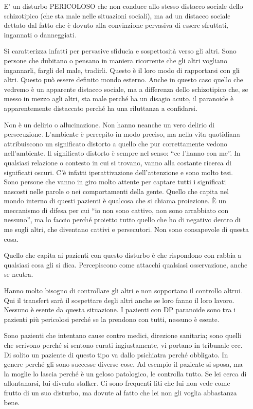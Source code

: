 \documentclass[]{article}
\begin{document}
E' un disturbo PERICOLOSO che non conduce allo stesso distacco sociale
dello schizotipico (che sta male nelle situazioni sociali), ma ad un
distacco sociale dettato dal fatto che è dovuto alla convinzione
pervasiva di essere sfruttati, ingannati o danneggiati.

Si caratterizza infatti per pervasive sfiducia e sospettosità verso gli
altri. Sono persone che dubitano o pensano in maniera ricorrente che gli
altri vogliano ingannarli, fargli del male, tradirli. Questo è il loro
modo di rapportarsi con gli altri. Questo può essere definito mondo
esterno. Anche in questo caso quello che vedremo è un apparente distacco
sociale, ma a differenza dello schizotipico che, se messo in mezzo agli
altri, sta male perché ha un disagio acuto, il paranoide è
apparentemente distaccato perché ha una riluttanza a confidarsi.

Non è un delirio o allucinazione. Non hanno neanche un vero delirio di
persecuzione. L'ambiente è percepito in modo preciso, ma nella vita
quotidiana attribuiscono un significato distorto a quello che pur
correttamente vedono nell'ambiente. Il significato distorto è sempre nel
senso: ``ce l'hanno con me''. In qualsiasi relazione o contesto in cui
si trovano, vanno alla costante ricerca di significati oscuri. C'è
infatti iperattivazione dell'attenzione e sono molto tesi. Sono persone
che vanno in giro molto attente per captare tutti i significati nascosti
nelle parole o nei comportamenti della gente. Quello che capita nel
mondo interno di questi pazienti è qualcosa che si chiama proiezione. È
un meccanismo di difesa per cui ``io non sono cattivo, non sono
arrabbiato con nessuno'', ma lo faccio perché proietto tutto quello che
ho di negativo dentro di me sugli altri, che diventano cattivi e
persecutori. Non sono consapevole di questa cosa.

Quello che capita ai pazienti con questo disturbo è che rispondono con
rabbia a qualsiasi cosa gli si dica. Percepiscono come attacchi
qualsiasi osservazione, anche se neutra.

Hanno molto bisogno di controllare gli altri e non sopportano il
controllo altrui. Qui il transfert sarà il sospettare degli altri anche
se loro fanno il loro lavoro. Nessuno è esente da questa situazione. I
pazienti con DP paranoide sono tra i pazienti più pericolosi perché se
la prendono con tutti, nessuno è esente.

Sono pazienti che intentano cause contro medici, direzione sanitaria;
sono quelli che scrivono perché si sentono curati ingiustamente, vi
portano in tribunale ecc. Di solito un paziente di questo tipo va dallo
psichiatra perché obbligato. In genere perché gli sono successe diverse
cose. Ad esempio il paziente si sposa, ma la moglie lo lascia perché è
un geloso patologico, le controlla tutto. Se lei cerca di allontanarsi,
lui diventa stalker. Ci sono frequenti liti che lui non vede come frutto
di un suo disturbo, ma dovute al fatto che lei non gli voglia abbastanza
bene.
\end{document}
